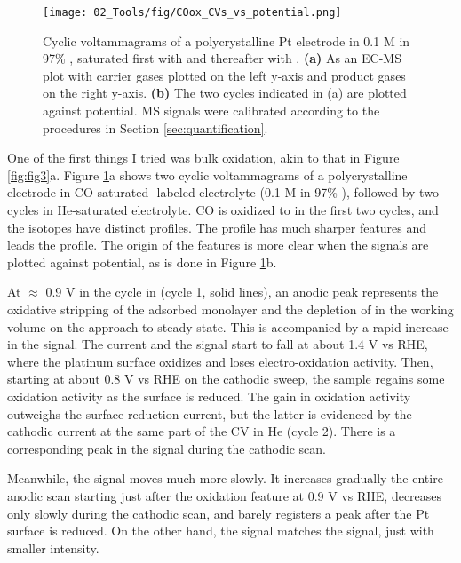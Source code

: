 \begin{figure}[h!]
	\centering
	\texttt{[image: 02\_Tools/fig/COox\_CVs\_vs\_potential.png]}
	\caption{Cyclic voltammagrams of a polycrystalline Pt electrode in 0.1 M  in 97\% , saturated first with  and thereafter with . \textbf{(a)} As an EC-MS plot with carrier gases plotted on the left y-axis and product gases on the right y-axis. \textbf{(b)} The two cycles indicated in (a) are plotted against potential. MS signals were calibrated according to the procedures in Section \ref{sec:quantification}.}
	\label{fig:COox_CVs}
\end{figure}
One of the first things I tried was bulk  oxidation, akin to that in Figure \ref{fig:fig3}a. Figure \ref{fig:COox_CVs}a shows two cyclic voltammagrams of a polycrystalline  electrode in CO-saturated -labeled electrolyte (0.1 M  in 97\% ), followed by two cycles in He-saturated electrolyte. CO is oxidized to  in the first two cycles, and the  isotopes have distinct profiles. The  profile has much sharper features and leads the  profile. The origin of the features is more clear when the  signals are plotted against potential, as is done in Figure \ref{fig:COox_CVs}b. 

At $\approx$ 0.9 V in the cycle in  (cycle 1, solid lines), an anodic peak represents the oxidative stripping of the adsorbed  monolayer and the depletion of  in the working volume on the approach to steady state. This is accompanied by a rapid increase in the  signal. The current and the  signal start to fall at about 1.4 V vs RHE, where the platinum surface oxidizes and loses  electro-oxidation activity. Then, starting at about 0.8 V vs RHE on the cathodic sweep, the sample regains some  oxidation activity as the surface is reduced. The gain in  oxidation activity outweighs the surface reduction current, but the latter is evidenced by the cathodic current at the same part of the CV in He (cycle 2). There is a corresponding peak in the  signal during the cathodic scan. 

Meanwhile, the  signal moves much more slowly. It increases gradually the entire anodic scan starting just after the oxidation feature at 0.9 V vs RHE, decreases only slowly during the cathodic scan, and barely registers a peak after the Pt surface is reduced. On the other hand, the  signal matches the  signal, just with smaller intensity.

